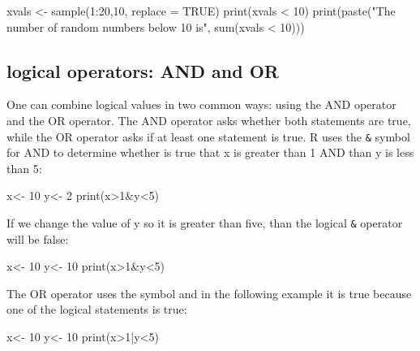 \documentclass[
  letterpaper,
  DIV=11,
  numbers=noendperiod]{scrreprt}
\newenvironment{Shaded}{\begin{snugshade}}{\end{snugshade}}
\newcommand{\NormalTok}[1]{\textcolor[rgb]{0.00,0.23,0.31}{#1}}
\begin{document}
\begin{Shaded}
\begin{Highlighting}[]
\NormalTok{xvals \textless{}{-} sample(1:20,10, replace = TRUE)}
\NormalTok{print(xvals \textless{} 10)}
\NormalTok{print(paste("The number of random numbers below 10 is", sum(xvals \textless{} 10)))}
\end{Highlighting}
\end{Shaded}

\hypertarget{logical-operators-and-and-or}{%
\subsection*{logical operators: AND and
OR}\label{logical-operators-and-and-or}}

One can combine logical values in two common ways: using the AND
operator and the OR operator. The AND operator asks whether both
statements are true, while the OR operator asks if at least one
statement is true. R uses the \texttt{\&} symbol for AND to determine
whether is true that x is greater than 1 AND than y is less than 5:

\begin{Shaded}
\begin{Highlighting}[]
\NormalTok{x\textless{}{-} 10}
\NormalTok{y\textless{}{-} 2}
\NormalTok{print(x\textgreater{}1\&y\textless{}5)}
\end{Highlighting}
\end{Shaded}

If we change the value of y so it is greater than five, than the logical
\texttt{\&} operator will be false:

\begin{Shaded}
\begin{Highlighting}[]
\NormalTok{x\textless{}{-} 10}
\NormalTok{y\textless{}{-} 10}
\NormalTok{print(x\textgreater{}1\&y\textless{}5)}
\end{Highlighting}
\end{Shaded}

The OR operator uses the symbol \texttt{\textbar{}} and in the following
example it is true because one of the logical statements is true:

\begin{Shaded}
\begin{Highlighting}[]
\NormalTok{x\textless{}{-} 10}
\NormalTok{y\textless{}{-} 10}
\NormalTok{print(x\textgreater{}1|y\textless{}5)}
\end{Highlighting}
\end{Shaded}
\end{document}
